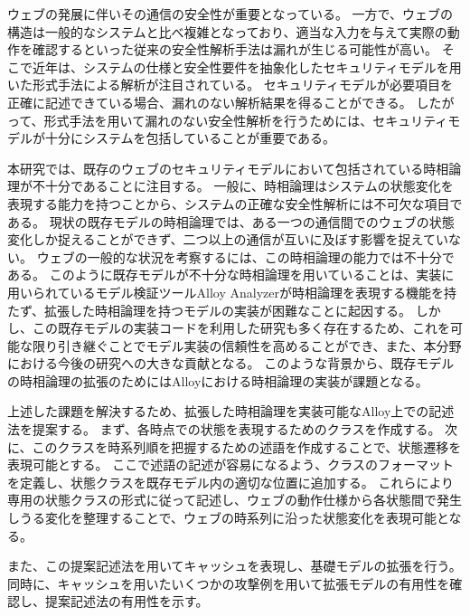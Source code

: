 \documentclass[12pt,a4paper]{jbook}
\begin{document}
ウェブの発展に伴いその通信の安全性が重要となっている。
一方で、ウェブの構造は一般的なシステムと比べ複雑となっており、適当な入力を与えて実際の動作を確認するといった従来の安全性解析手法は漏れが生じる可能性が高い。
そこで近年は、システムの仕様と安全性要件を抽象化したセキュリティモデルを用いた形式手法による解析が注目されている。
セキュリティモデルが必要項目を正確に記述できている場合、漏れのない解析結果を得ることができる。
したがって、形式手法を用いて漏れのない安全性解析を行うためには、セキュリティモデルが十分にシステムを包括していることが重要である。

本研究では、既存のウェブのセキュリティモデルにおいて包括されている時相論理が不十分であることに注目する。
一般に、時相論理はシステムの状態変化を表現する能力を持つことから、システムの正確な安全性解析には不可欠な項目である。
現状の既存モデルの時相論理では、ある一つの通信間でのウェブの状態変化しか捉えることができず、二つ以上の通信が互いに及ぼす影響を捉えていない。
ウェブの一般的な状況を考察するには、この時相論理の能力では不十分である。
このように既存モデルが不十分な時相論理を用いていることは、実装に用いられているモデル検証ツールAlloy Analyzerが時相論理を表現する機能を持たず、拡張した時相論理を持つモデルの実装が困難なことに起因する。
しかし、この既存モデルの実装コードを利用した研究も多く存在するため、これを可能な限り引き継ぐことでモデル実装の信頼性を高めることができ、また、本分野における今後の研究への大きな貢献となる。
このような背景から、既存モデルの時相論理の拡張のためにはAlloyにおける時相論理の実装が課題となる。

上述した課題を解決するため、拡張した時相論理を実装可能なAlloy上での記述法を提案する。
\color{red}
まず、各時点での状態を表現するためのクラスを作成する。
次に、このクラスを時系列順を把握するための述語を作成することで、状態遷移を表現可能とする。
ここで述語の記述が容易になるよう、クラスのフォーマットを定義し、状態クラスを既存モデル内の適切な位置に追加する。
これらにより専用の状態クラスの形式に従って記述し、ウェブの動作仕様から各状態間で発生しうる変化を整理することで、ウェブの時系列に沿った状態変化を表現可能となる。
\color{black}

また、この提案記述法を用いてキャッシュを表現し、基礎モデルの拡張を行う。
同時に、キャッシュを用いたいくつかの攻撃例を用いて拡張モデルの有用性を確認し、提案記述法の有用性を示す。
\end{document}
